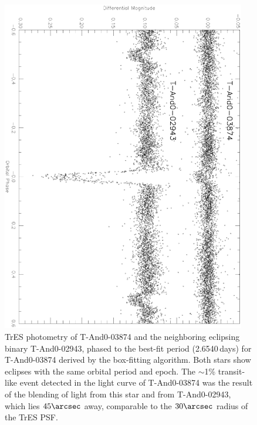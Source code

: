 \begin{figure}
\begin{center}
\includegraphics[angle=90, width=0.95\textwidth]{2_f7}
\caption[TrES photometry of \mbox{T-And0-03874} and the neighboring binary]{TrES photometry of \mbox{T-And0-03874} and the neighboring eclipsing binary \mbox{T-And0-02943}, phased to the best-fit period (2.6540\,days) for \mbox{T-And0-03874} derived by the box-fitting algorithm. Both stars show eclipses with the same orbital period and epoch. The $\sim$1\% transit-like event detected in the light curve of \mbox{T-And0-03874} was the result of the blending of light from this star and from \mbox{T-And0-02943}, which lies $45\arcsec$ away, comparable to the $30\arcsec$ radius of the TrES PSF. }\label{cha:and0:fig:compblend}
\end{center}
\end{figure}

